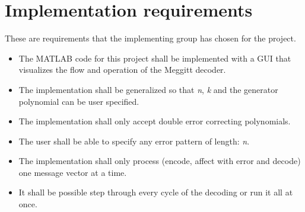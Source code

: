 \documentclass[MiniProjectMain]{subfiles}
\begin{document}
\section{Implementation requirements}
These are requirements that the implementing group has chosen for the project.
\begin{itemize}
\item 
The MATLAB code for this project shall be implemented with a GUI that visualizes the flow and operation of the Meggitt decoder.

\item
The implementation shall be generalized so that \textit{n}, \textit{k} and the generator polynomial can be user specified.

\item
The implementation shall only accept double error correcting polynomials.

\item
The user shall be able to specify any error pattern of length: \textit{n}.

\item
The implementation shall only process (encode, affect with error and decode) one message vector at a time.

\item
It shall be possible step through every cycle of the decoding or run it all at once. 

\end{itemize}
\end{document}
